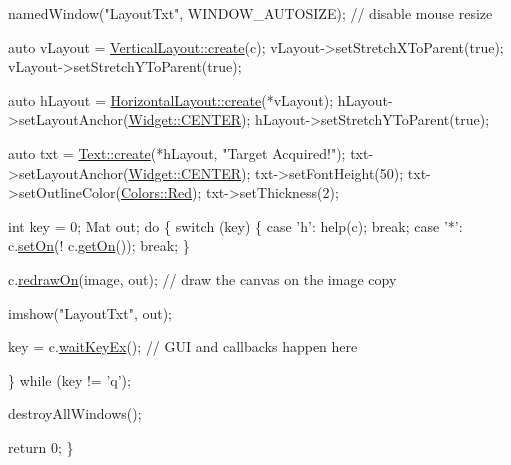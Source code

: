 \begin{DoxyCode}
    namedWindow(\textcolor{stringliteral}{"LayoutTxt"}, WINDOW\_AUTOSIZE); \textcolor{comment}{// disable mouse resize}

    \textcolor{keyword}{auto} vLayout = \hyperlink{classcanvascv_1_1VerticalLayout_a3e0ae249db062663815d2d822e178dd3}{VerticalLayout::create}(c);
    vLayout->setStretchXToParent(\textcolor{keyword}{true});
    vLayout->setStretchYToParent(\textcolor{keyword}{true});

    \textcolor{keyword}{auto} hLayout = \hyperlink{classcanvascv_1_1HorizontalLayout_aea31dd787cbf985687ead6a55efa1839}{HorizontalLayout::create}(*vLayout);
    hLayout->setLayoutAnchor(\hyperlink{classcanvascv_1_1Widget_a98ca3c300ba50b316fa5a1d300456abea2cd62693af40f3c5f559a07d6a61a55d}{Widget::CENTER});
    hLayout->setStretchYToParent(\textcolor{keyword}{true});

    \textcolor{keyword}{auto} txt = \hyperlink{classcanvascv_1_1Text_a7f3552263b6f185f78d90549e7ac38f7}{Text::create}(*hLayout, \textcolor{stringliteral}{"Target Acquired!"});
    txt->setLayoutAnchor(\hyperlink{classcanvascv_1_1Widget_a98ca3c300ba50b316fa5a1d300456abea2cd62693af40f3c5f559a07d6a61a55d}{Widget::CENTER});
    txt->setFontHeight(50);
    txt->setOutlineColor(\hyperlink{classcanvascv_1_1Colors_a10aff24c53edf45b038d0636b061f9c2}{Colors::Red});
    txt->setThickness(2);

    \textcolor{keywordtype}{int} key = 0;
    Mat out;
    \textcolor{keywordflow}{do}
    \{
        \textcolor{keywordflow}{switch} (key)
        \{
        \textcolor{keywordflow}{case} \textcolor{charliteral}{'h'}:
            help(c);
            \textcolor{keywordflow}{break};
        \textcolor{keywordflow}{case} \textcolor{charliteral}{'*'}:
            c.\hyperlink{classcanvascv_1_1Canvas_aba149ea25c6cdad2673133a060355954}{setOn}(! c.\hyperlink{classcanvascv_1_1Canvas_afe6a2955a5bbee8903350b4fba3f4473}{getOn}());
            \textcolor{keywordflow}{break};
        \}

        c.\hyperlink{classcanvascv_1_1Canvas_a018c66e277de7904b8146ea3f3feebdd}{redrawOn}(image, out);  \textcolor{comment}{// draw the canvas on the image copy}

        imshow(\textcolor{stringliteral}{"LayoutTxt"}, out);

        key = c.\hyperlink{classcanvascv_1_1Canvas_a59397db05f5d9e45264f626f6a2ae528}{waitKeyEx}(); \textcolor{comment}{// GUI and callbacks happen here}

    \} \textcolor{keywordflow}{while} (key != \textcolor{charliteral}{'q'});

    destroyAllWindows();

    \textcolor{keywordflow}{return} 0;
\}
\end{DoxyCode}
